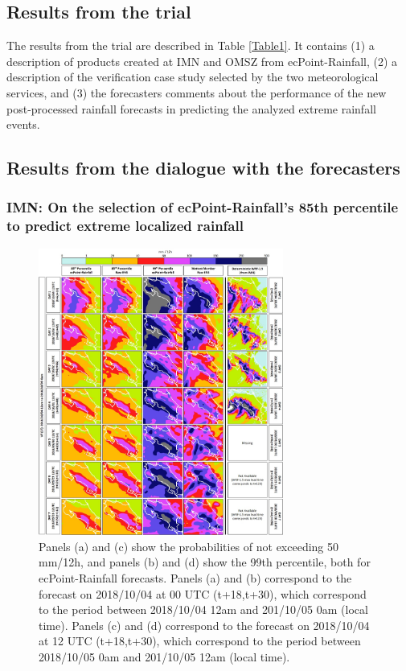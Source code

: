 \documentclass[twocol]{ametsocV5} %
\begin{document}
\subsection{Results from the trial}
The results from the trial are described in Table \ref{Table1}. It contains (1) a description of products created at IMN and OMSZ from ecPoint-Rainfall, (2) a description of the verification case study selected by the two meteorological services, and (3) the forecasters comments about the performance of the new post-processed rainfall forecasts in predicting the analyzed extreme rainfall events.

\subsection{Results from the dialogue with the forecasters}

\subsubsection{IMN: On the selection of ecPoint-Rainfall's 85th percentile to predict extreme localized rainfall}

\begin{figure}
\centerline{\includegraphics[width=19pc]{manuscript/Figures/Fig6.jpg}}
\caption{Panels (a) and (c) show the probabilities of not exceeding 50 mm/12h, and panels (b) and (d) show the 99th percentile, both for ecPoint-Rainfall forecasts. Panels (a) and (b) correspond to the forecast on 2018/10/04 at 00 UTC (t+18,t+30), which correspond to the period between 2018/10/04 12am and 201/10/05 0am (local time). Panels (c) and (d) correspond to the forecast on 2018/10/04 at 12 UTC (t+18,t+30), which correspond to the period between 2018/10/05 0am and 201/10/05 12am (local time).} 
\label{Fig6}
\end{figure}
\end{document}
